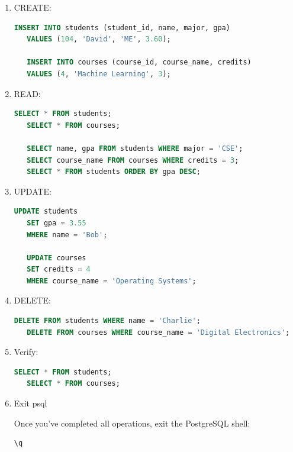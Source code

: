 \documentclass[12pt,a4paper]{article}
\begin{document}
\begin{enumerate}

\item CREATE:

   \begin{lstlisting}[language=SQL]
   INSERT INTO students (student_id, name, major, gpa)
   VALUES (104, 'David', 'ME', 3.60);

   INSERT INTO courses (course_id, course_name, credits)
   VALUES (4, 'Machine Learning', 3);
   \end{lstlisting}

\item READ:

   \begin{lstlisting}[language=SQL]
   SELECT * FROM students;
   SELECT * FROM courses;

   SELECT name, gpa FROM students WHERE major = 'CSE';
   SELECT course_name FROM courses WHERE credits = 3;
   SELECT * FROM students ORDER BY gpa DESC;
   \end{lstlisting}

\item UPDATE:

   \begin{lstlisting}[language=SQL]
   UPDATE students
   SET gpa = 3.55
   WHERE name = 'Bob';

   UPDATE courses
   SET credits = 4
   WHERE course_name = 'Operating Systems';
   \end{lstlisting}

\item DELETE:

   \begin{lstlisting}[language=SQL]
   DELETE FROM students WHERE name = 'Charlie';
   DELETE FROM courses WHERE course_name = 'Digital Electronics';
   \end{lstlisting}

\item Verify:

   \begin{lstlisting}[language=SQL]
   SELECT * FROM students;
   SELECT * FROM courses;
   \end{lstlisting}



\item Exit psql

Once you've completed all operations, exit the PostgreSQL shell:

\begin{lstlisting}[language=SQL]
\q
\end{lstlisting}


\end{enumerate}
\end{document}
